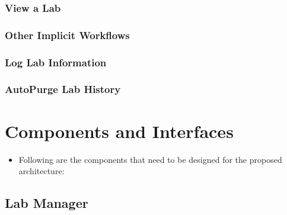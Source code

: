 \documentclass[11pt]{article}
\begin{document}
\subsubsection{View a Lab}
\label{sec-3.5.4}

\subsubsection{Other Implicit Workflows}
\label{sec-3.5.5}

\subsubsection{Log Lab Information}
\label{sec-3.5.6}

\subsubsection{AutoPurge Lab History}
\label{sec-3.5.7}

\section{Components and Interfaces}
\label{sec-4}

\begin{itemize}
\item Following are the components that need to be designed for the proposed architecture:
\end{itemize}
\subsection{Lab Manager}
\label{sec-4.1}
\end{document}
